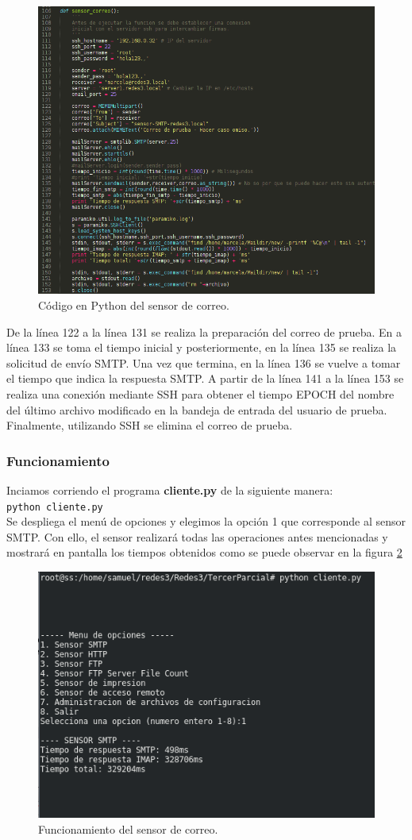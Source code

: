 \FloatBarrier
\begin{figure}[htbp!]
		\centering
			\includegraphics[width=.70 \textwidth]{images/sensorcorreo}
		\caption{Código en Python del sensor de correo.}
		\label{image:sensorcorreo}
\end{figure}
\FloatBarrier

De la línea 122 a la línea 131 se realiza la preparación del correo de prueba. En a línea 133 se toma el tiempo inicial y posteriormente, en la línea 135 se realiza la solicitud de envío SMTP. Una vez que termina, en la línea 136 se vuelve a tomar el tiempo que indica la respuesta SMTP. A partir de la línea 141 a la línea 153 se realiza una conexión mediante SSH para obtener el tiempo EPOCH del nombre del último archivo modificado en la bandeja de entrada del usuario de prueba. Finalmente, utilizando SSH se elimina el correo de prueba.

\subsubsection{Funcionamiento}
Inciamos corriendo el programa \textbf{cliente.py} de la siguiente manera:\\
\texttt{python cliente.py}\\
Se despliega el menú de opciones y elegimos la opción 1 que corresponde al sensor SMTP. Con ello, el sensor realizará todas las operaciones antes mencionadas y mostrará en pantalla los tiempos obtenidos como se puede observar en la figura \ref{image:sensorcorreofunc}

\FloatBarrier
\begin{figure}[htbp!]
		\centering
			\includegraphics[width=.65 \textwidth]{images/sensorcorreofunc}
		\caption{Funcionamiento del sensor de correo.}
		\label{image:sensorcorreofunc}
\end{figure}
\FloatBarrier